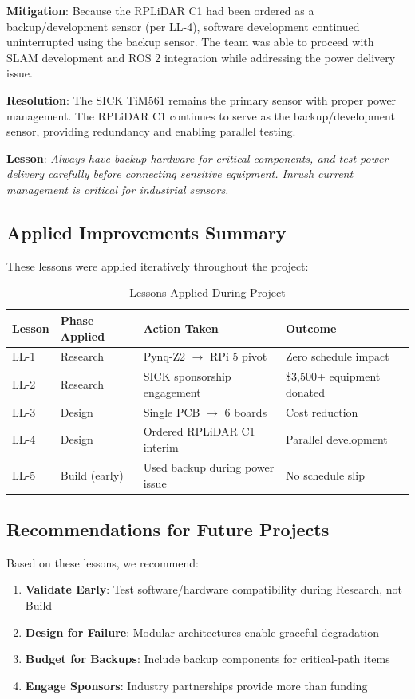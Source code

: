 \textbf{Mitigation}: Because the RPLiDAR C1 had been ordered as a backup/development sensor (per LL-4), software development continued uninterrupted using the backup sensor. The team was able to proceed with SLAM development and ROS 2 integration while addressing the power delivery issue.

\textbf{Resolution}: The SICK TiM561 remains the primary sensor with proper power management. The RPLiDAR C1 continues to serve as the backup/development sensor, providing redundancy and enabling parallel testing.

\textbf{Lesson}: \textit{Always have backup hardware for critical components, and test power delivery carefully before connecting sensitive equipment. Inrush current management is critical for industrial sensors.}

\subsection{Applied Improvements Summary}

These lessons were applied iteratively throughout the project:


\begin{table}[H]
\centering
\caption{Lessons Applied During Project}
\label{tab:lessons_applied}
\begin{tabular}{@{}llll@{}}
\toprule
\textbf{Lesson} & \textbf{Phase Applied} & \textbf{Action Taken} & \textbf{Outcome} \\
\midrule
LL-1 & Research & Pynq-Z2 $\rightarrow$ RPi 5 pivot & Zero schedule impact \\ 
LL-2 & Research & SICK sponsorship engagement & \$3,500+ equipment donated \\
LL-3 & Design & Single PCB $\rightarrow$ 6 boards & Cost reduction \\
LL-4 & Design & Ordered RPLiDAR C1 interim & Parallel development \\
LL-5 & Build (early) & Used backup during power issue & No schedule slip \\
\bottomrule
\end{tabular}
\end{table}

\subsection{Recommendations for Future Projects}

Based on these lessons, we recommend:

\begin{enumerate}
    \item \textbf{Validate Early}: Test software/hardware compatibility during Research, not Build
    \item \textbf{Design for Failure}: Modular architectures enable graceful degradation
    \item \textbf{Budget for Backups}: Include backup components for critical-path items
    \item \textbf{Engage Sponsors}: Industry partnerships provide more than funding
\end{enumerate}
